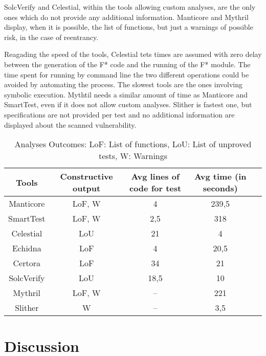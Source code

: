 SolcVerify and Celestial, within the tools allowing custom analyses, are the only ones which do not provide any additional information. 
Manticore and Mythril display, when it is possible, the list of functions, but just a warnings of possible risk, in the case of reentrancy. 

Reagading the speed of the tools, Celestial tets times are assumed with zero delay between the generation of the F* code and the running of the F* module. 
The time spent for running by command line the two different operations could be avoided by automating the process.
The slowest tools are the ones involving symbolic execution. Mythtil needs a similar amount of time as Manticore and SmartTest, even if it does not allow custom analyses. 
Slither is fastest one, but specifications are not provided per test and no additional information are displayed about the scanned vulnerability.
\begin{center}
    \begin{table*}
        \footnotesize
        \caption{Analyses Outcomes: 
        LoF: List of functions, LoU: List of unproved tests, W: Warnings}
        \label{tab:Outcomes}
        \begin{tabular}{ccccc}
        \toprule
        Tools  & Constructive output &  Avg lines of code for test & Avg time (in seconds) \\
        \midrule
            Manticore & LoF, W  & 4  &  239,5 \\
            SmartTest & LoF, W & 2,5 &  318  \\
            Celestial & LoU & 21  &  4  \\
            Echidna & LoF  & 4  & 20,5 \\
            Certora & LoF   & 34 &  21  \\ 
            SolcVerify & LoU  &  18,5 &  10  \\
            Mythril & LoF, W  & --  &  221  \\ 
            Slither& W & --  &  3,5  \\ 
        \bottomrule
        \end{tabular}
    \end{table*}
\end{center}




\chapter{Discussion}
\label{ch:Discussion}

